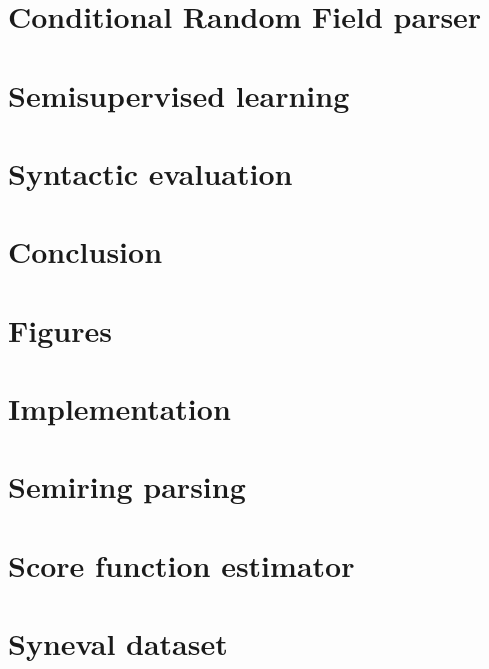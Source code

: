 \documentclass{uvamath}
\theoremstyle{remark}
\theoremstyle{definition}
\theoremstyle{definition}
\theoremstyle{definition}
\theoremstyle{definition}
\theoremstyle{definition}
\begin{document}
\chapter{Conditional Random Field parser}
\label{04-crf}



\chapter{Semisupervised learning}
\label{05-semisupervised}



\chapter{Syntactic evaluation}
\label{06-syneval}



\chapter{Conclusion}
\label{07-conclusion}



\appendix
\chapter{Figures}
\label{A1-figures}



\chapter{Implementation}
\label{A2-implementation}



\chapter{Semiring parsing}
\label{A3-crf}



\chapter{Score function estimator}
\label{A4-vi}



\chapter{Syneval dataset}
\label{A5-syneval}







\backmatter  %
\end{document}
